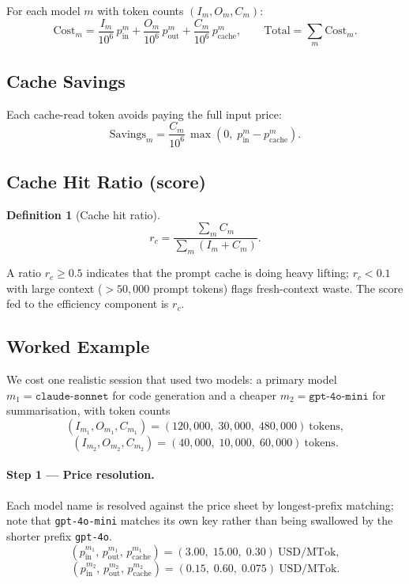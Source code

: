 \documentclass[11pt,a4paper]{article}
\newtheorem{definition}{Definition}
\begin{document}
For each model $m$ with token counts $(I_m, O_m, C_m)$:
\[
  \text{Cost}_m = \frac{I_m}{10^6}\,p^m_{\text{in}}
                + \frac{O_m}{10^6}\,p^m_{\text{out}}
                + \frac{C_m}{10^6}\,p^m_{\text{cache}},
  \qquad
  \text{Total} = \sum_m \text{Cost}_m.
\]

\subsection{Cache Savings}

Each cache-read token avoids paying the full input price:
\[
  \text{Savings}_m = \frac{C_m}{10^6}\,\max\!\left(0,\;p^m_{\text{in}} - p^m_{\text{cache}}\right).
\]

\subsection{Cache Hit Ratio (score)}

\begin{definition}[Cache hit ratio]
\[
  r_c = \frac{\sum_m C_m}{\sum_m (I_m + C_m)}.
\]
\end{definition}

A ratio $r_c \geq 0.5$ indicates that the prompt cache is doing heavy lifting;
$r_c < 0.1$ with large context ($> 50{,}000$ prompt tokens) flags fresh-context
waste.  The score fed to the efficiency component is $r_c$.

\subsection{Worked Example}
\label{sec:token-economics-example}

We cost one realistic session that used two models: a primary model
$m_1 = \texttt{claude-sonnet}$ for code generation and a cheaper
$m_2 = \texttt{gpt-4o-mini}$ for summarisation, with token counts
\[
  (I_{m_1}, O_{m_1}, C_{m_1}) = (120{,}000,\; 30{,}000,\; 480{,}000)\ \text{tokens},
\]
\[
  (I_{m_2}, O_{m_2}, C_{m_2}) = (40{,}000,\; 10{,}000,\; 60{,}000)\ \text{tokens}.
\]

\paragraph{Step 1 --- Price resolution.}
Each model name is resolved against the price sheet by longest-prefix
matching; note that \texttt{gpt-4o-mini} matches its own key rather than
being swallowed by the shorter prefix \texttt{gpt-4o}.
\[
  (p^{m_1}_{\text{in}},\, p^{m_1}_{\text{out}},\, p^{m_1}_{\text{cache}})
  = (3.00,\; 15.00,\; 0.30)\ \text{USD/MTok},
\]
\[
  (p^{m_2}_{\text{in}},\, p^{m_2}_{\text{out}},\, p^{m_2}_{\text{cache}})
  = (0.15,\; 0.60,\; 0.075)\ \text{USD/MTok}.
\]
\end{document}
